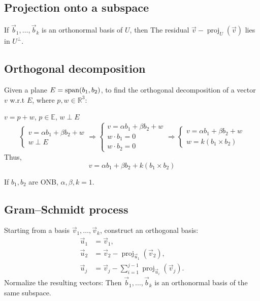 \documentclass{article}
\begin{document}
\subsection{Projection onto a subspace}
If $\vec{b}_1,\dots,\vec{b}_k$ is an orthonormal basis of $U$, then
The residual $\vec{v}-\operatorname{proj}_U(\vec{v})$ lies in
$U^\perp$.

\subsection{Orthogonal decomposition}
Given a plane $E = \operatorname{span}(b_1,b_2)$, to find the orthogonal decomposition of a vector $v$ w.r.t $E$, where $p,w \in \mathbb{R}^3$:

$v = p+w$, $p\in \mathbb{E}$, $w \perp E$
\begin{equation*}
    \begin{cases}
        v = \alpha b_1 + \beta b_2 + w\\
        w \perp E
    \end{cases} \Rightarrow
    \begin{cases}
        v = \alpha b_1 + \beta b_2 + w\\
        w\cdot b_1 = 0\\
        w\cdot b_2 = 0
    \end{cases} \Rightarrow
        \begin{cases}
        v = \alpha b_1 + \beta b_2 + w\\
        w = k\left(b_1 \times b_2\right)
    \end{cases}
\end{equation*}
Thus,
\[v = \alpha b_1 + \beta b_2 + k\left(b_1 \times b_2\right)\]

If $b_1,b_2$ are ONB, $\alpha,\beta,k = 1$.

\subsection{Gram--Schmidt process}
Starting from a basis $\vec{v}_1,\dots,\vec{v}_k$, construct an
orthogonal basis:
\begin{align*}
    \vec{u}_1&=\vec{v}_1,\\
    \vec{u}_2&=\vec{v}_2-\operatorname{proj}_{\vec{u}_1}(\vec{v}_2),\\
    \vec{u}_j&=\vec{v}_j-
        \sum_{i=1}^{j-1}
        \operatorname{proj}_{\vec{u}_i}(\vec{v}_j).
\end{align*}
Normalize the resulting vectors:
Then $\vec{b}_1,\dots,\vec{b}_k$ is an orthonormal basis of the same
subspace.
\end{document}
